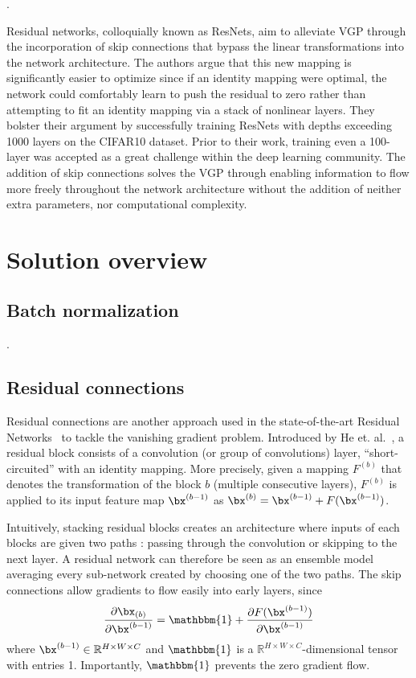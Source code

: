 \documentclass{article}
\begin{document}
\questionTwo.

Residual networks, colloquially
known as ResNets, aim to alleviate VGP through the
incorporation of skip connections that bypass the linear
transformations into the network architecture. 
The authors argue that this new mapping is significantly easier
to optimize since if an identity mapping were optimal, the
network could comfortably learn to push the residual to
zero rather than attempting to fit an identity mapping via
a stack of nonlinear layers. 
They bolster their argument
by successfully training ResNets with depths exceeding
1000 layers on the CIFAR10 dataset.
Prior to their work, training even a 100-layer was accepted
as a great challenge within the deep learning community.
The addition of skip connections solves the VGP through
enabling information to flow more freely throughout the
network architecture without the addition of neither extra
parameters, nor computational complexity.

\section{Solution overview}
\subsection{Batch normalization}

\questionThree.


\subsection{Residual connections}

Residual connections are another approach used in the state-of-the-art Residual Networks~\cite{he2016deep} to tackle the vanishing gradient problem.
Introduced by He et. al.~\cite{he2016deep}, a residual block consists of a
convolution (or group of convolutions) layer, ``short-circuited'' with an identity mapping.
More precisely, given a mapping $F^{(b)}$ that denotes the transformation of the block $b$ (multiple consecutive layers), $F^{(b)}$ is applied to its input
feature map $\bx^{(b-1)}$ as $\bx^{(b)} = \bx^{(b-1)} + {F}(\bx^{(b-1)})$.

Intuitively, stacking residual blocks creates an architecture where inputs of each blocks
are given two paths : passing through the convolution or skipping to the next layer. A 
residual network can therefore be seen as an ensemble model averaging every sub-network
created by choosing one of the two paths. The skip connections allow gradients to flow
easily into early layers, since 
\begin{equation}
    \frac{\partial \bx_{(b)}}{\partial \bx^{(b-1)}} = \mathbbm{1} + \frac{\partial{F}(\bx^{(b-1)})}{\partial \bx^{(b-1)}}
    \label{eq.grad_skip}
\end{equation} where $\bx^{(b-1)} \in \mathbb{R}^{H \times W \times C}$ and $\mathbbm{1}$ is a $\mathbb{R}^{H \times W \times C}$-dimensional tensor with entries 1. 
Importantly, $\mathbbm{1}$ prevents the zero gradient flow.
\end{document}
